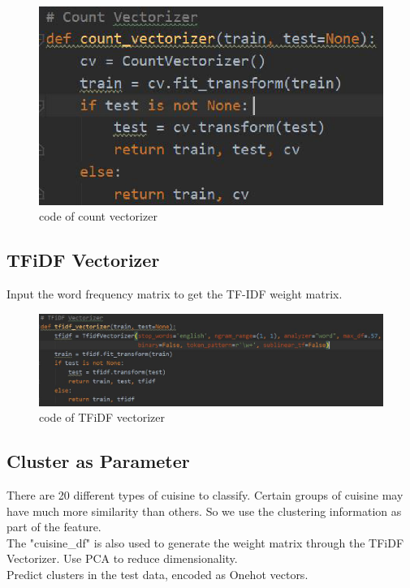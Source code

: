 \documentclass{amsart}
\begin{document}
\begin{figure}[htbp]
	\includegraphics[scale=0.8]{./figure1/6.eps}
	\caption{code of count vectorizer}
\end{figure}

\subsection{TFiDF Vectorizer}
Input the word frequency matrix to get the TF-IDF weight matrix.
\begin{figure}[htbp]
	\includegraphics[scale=0.5]{./figure1/7.eps}
	\caption{code of TFiDF vectorizer}
\end{figure}

\subsection{Cluster as Parameter}
There are 20 different types of cuisine to classify. Certain groups of cuisine may have much more similarity than others. So we use the clustering information as part of the feature.\\

The "cuisine\_df" is also used to generate the weight matrix through the TFiDF Vectorizer. Use PCA to reduce dimensionality.\\

Predict clusters in the test data, encoded as Onehot vectors.\\
\end{document}
